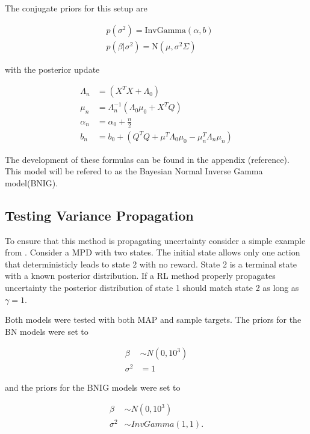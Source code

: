 The conjugate priors for this setup are

\begin{align*}
    & p(\sigma^2) = \text{InvGamma}(\alpha, b)          \\
    & p(\beta|\sigma^2) = \text{N}(\mu, \sigma^2\Sigma) 
\end{align*}

with the posterior update

\begin{align*}
    \label{eq:unknown_noise_posterior_update}
	\Lambda_n & = (X^TX + \Lambda_0)                                         \\
	\mu_n     & = \Lambda_n^{-1}(\Lambda_0\mu_0 + X^TQ)                      \\
	\alpha_n  & = \alpha_0 + \frac{n}{2}                                     \\
	b_n       & = b_0 + (Q^TQ + \mu^T\Lambda_0\mu_0 - \mu_n^T\Lambda_n\mu_n) 
\end{align*}

The development of these formulas can be found in the appendix (\todo reference). This model will be refered to as the Bayesian Normal Inverse Gamma model(BNIG).

\subsection{Testing Variance Propagation}

To ensure that this method is propagating uncertainty consider a simple example from \cite{osband_2018}. Consider a MPD with two states. The initial state allows only one action that deterministicly leads to state 2 with no reward. State 2 is a terminal state with a known posterior distribution. If a RL method properly propagates uncertainty the posterior distribution of state 1 should match state 2 as long as $\gamma=1$. 

Both models were tested with both MAP and sample targets. The priors for the BN models were set to

\begin{align*}
    \beta &\sim N(0,10^3)\\
    \sigma^2 &= 1
\end{align*}

and the priors for the BNIG models were set to

\begin{align*}
    \beta &\sim N(0,10^3) \\
    \sigma^2 &\sim InvGamma(1,1).
\end{align*}

